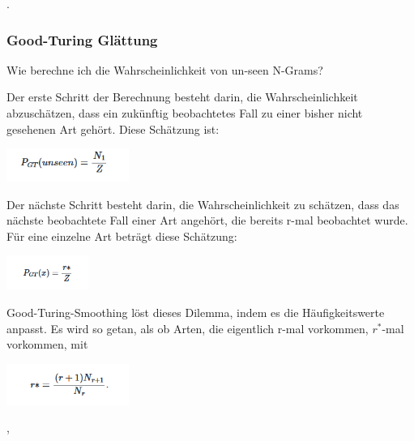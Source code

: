 \documentclass[12pt]{article}
\begin{document}
\cite{jurafsky2023}.

\subsubsection{Good-Turing Glättung}
Wie berechne ich die Wahrscheinlichkeit von un-seen N-Grams?

Der erste Schritt der Berechnung besteht darin, die Wahrscheinlichkeit abzuschätzen, dass ein zukünftig beobachtetes Fall zu einer bisher nicht gesehenen Art gehört. Diese Schätzung ist:
\begin{center}
	\includegraphics[width=0.3\textwidth]{statics/Borisov/5.PNG}
\end{center}

Der nächste Schritt besteht darin, die Wahrscheinlichkeit zu schätzen, dass das nächste beobachtete Fall einer Art angehört, die bereits r-mal beobachtet wurde. Für eine einzelne Art beträgt diese Schätzung:
\begin{center}
	\includegraphics[width=0.2\textwidth]{statics/Borisov/6.PNG}
\end{center}
Good-Turing-Smoothing löst dieses Dilemma, indem es die Häufigkeitswerte anpasst. Es wird so getan, als ob Arten, die eigentlich r-mal vorkommen, \( r^* \)-mal vorkommen, mit
\begin{center}
	\includegraphics[width=0.3\textwidth]{statics/Borisov/7.PNG}
\end{center}
\cite{maucher2022}, \cite{gale1995}
\end{document}

